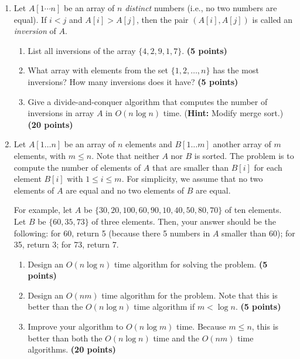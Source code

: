 \documentclass[11pt]{article}
\begin{document}
\begin{enumerate}



\item
Let $A[1\cdots n]$ be an array of $n$ {\em distinct} numbers (i.e., no two
numbers are equal). If $i<j$ and $A[i]>A[j]$, then the pair
$(A[i],A[j])$ is called an {\em inversion} of $A$.

\begin{enumerate}
\item
	List all inversions of the array $\{ 4,2,9,1,7\}$. {\hfill \bf (5 points)}

\item
	What array with elements from the set $\{1,2,\ldots,n\}$ has the
	most inversions? How many inversions does it have?
	{\hfill \bf (5 points)}

\item
	Give a divide-and-conquer algorithm that computes the number of
	inversions in array $A$ in $O(n\log n)$
	time. ({\bf Hint:} Modify merge sort.)	{\hfill \bf (20 points)}

\end{enumerate}


\item

Let $A[1\ldots n]$ be an array of $n$ elements and $B[1\ldots m]$ another array of $m$ elements, with $m\leq n$. Note that neither $A$ nor $B$ is sorted. The problem is to compute the number of elements of $A$ that are smaller than $B[i]$ for each element $B[i]$ with $1\leq i\leq m$.
For simplicity, we assume that no two elements of $A$ are equal and no two elements of $B$ are equal.

For example, let $A$ be $\{30, 20, 100, 60, 90, 10, 40, 50, 80, 70\}$ of ten elements. Let $B$ be $\{60, 35, 73\}$ of three elements. Then, your answer should be the following: for 60, return 5 (because there 5 numbers in $A$ smaller than 60); for 35, return 3; for 73, return 7.

\begin{enumerate}
\item
Design an $O(n\log n)$ time algorithm for solving the problem. {\hfill \bf (5 points)}

\item
Design an $O(nm)$ time algorithm for the problem. Note that this is better than the $O(n\log n)$ time algorithm if $m<\log n$. {\hfill \bf (5 points)}

\item
Improve your algorithm to $O(n\log m)$ time. Because $m\leq n$, this is better than both the $O(n\log n)$ time and the $O(nm)$ time algorithms. {\hfill \bf (20 points)}



\end{enumerate}
\end{enumerate}
\end{document}
